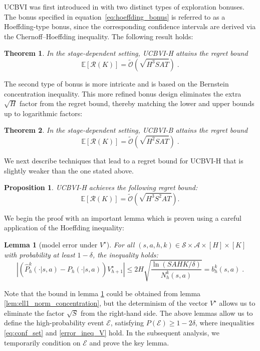 \documentclass{article}
\numberwithin{equation}{section}
\newtheorem{theorem}{Theorem}
\newtheorem{lemma}{Lemma}
\newtheorem{proposition}{Proposition}
\newcommand{\E}{\mathbb E}
\newcommand{\cA}{\mathcal{A}}
\newcommand{\cS}{\mathcal{S}}
\newcommand{\eqsp}{\;}
\begin{document}
UCBVI was first introduced in \cite{azar2017minimax} with two distinct types of exploration bonuses. The bonus specified in equation~\eqref{eq:hoeffding_bonus} is referred to as a Hoeffding-type bonus, since the corresponding confidence intervals are derived via the Chernoff–Hoeffding inequality. The following result holds: 
\begin{theorem}
    In the stage-dependent setting, UCBVI-H attains the regret bound
    \begin{equation*}
         \E[\mathcal{R}(K)] = \widetilde{\mathcal{O}}(\sqrt{H^3SAT})\eqsp.
    \end{equation*}
\end{theorem}
The second type of bonus is more intricate and is based on the Bernstein concentration inequality. This more refined bonus design eliminates the extra \(\sqrt{H}\)
factor from the regret bound, thereby matching the lower and upper bounds up to logarithmic factors:
\begin{theorem}\label{th:ucbvi_bern}
    In the stage-dependent setting, UCBVI-B attains the regret bound
    \begin{equation*}
         \E[\mathcal{R}(K)] = \widetilde{\mathcal{O}}(\sqrt{H^2SAT})\eqsp.
    \end{equation*}
\end{theorem}
We next describe techniques that lead to a regret bound for UCBVI-H that is slightly weaker than the one stated above.
\begin{proposition}\label{prop:ucbvi_h}
    UCBVI-H achieves the following regret bound:
    \begin{equation*}
         \E[\mathcal{R}(K)] = \widetilde{\mathcal{O}}( \sqrt{H^3S^2AT}).
    \end{equation*}
\end{proposition}
We begin the proof with an important lemma which is proven using a careful application of the Hoeffding inequality:
\begin{lemma}[model error under \(V^{\star}\)]\label{error_V}
   For all \((s,a,h,k) \in {\cS\times \cA}\times[H]\times[K] \) with probability at least \( 1 - \delta \), the inequality holds:
\begin{equation}\label{error_ineq_V}
    \left| (\widehat{P}_h^k(\cdot|s, a) - P_h(\cdot |s,a)) V_{h+1}^{\star} \right | \leq 2H\sqrt{\frac{\ln{(SAHK/\delta)}}{N_h^k(s,a)}} = b_h^k(s,a)\eqsp.
\end{equation} 
\end{lemma}
Note that the bound in lemma \ref{error_V} could be obtained from lemma \ref{lem:ell1_norm_concentration}, but the determinism of the vector \( V^{\star} \) allows us to eliminate the factor \( \sqrt{S} \) from the right-hand side. The above lemmas allow us to define the high-probability event \( \mathcal{E} \), satisfying \( P(\mathcal{E}) \geq 1 - 2\delta \), where inequalities \eqref{eq:conf_set} and \eqref{error_ineq_V} hold.
In the subsequent analysis, we temporarily condition on \( \mathcal{E} \) and prove the key lemma.
\end{document}
